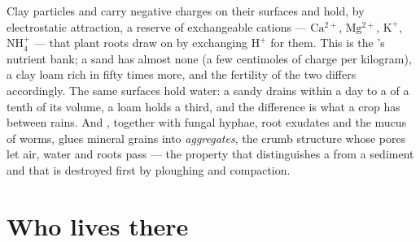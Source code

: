 \begin{proposition}\label{prop:b2:living-soil:cec}
Clay particles and  carry negative charges on their surfaces
and hold, by electrostatic attraction, a reserve of exchangeable
cations --- $\mathrm{Ca^{2+}}$, $\mathrm{Mg^{2+}}$, $\mathrm{K^{+}}$, $\mathrm{NH_4^{+}}$ --- that
plant roots draw on by exchanging $\mathrm{H^{+}}$ for them. This
\emph{} is the 's nutrient bank; a sand
has almost none (a few centimoles of charge per kilogram), a clay
loam rich in  fifty times more, and the fertility of the two
differs accordingly. The same surfaces hold water: a sandy 
drains within a day to a \emph{} of a tenth of its
volume, a loam holds a third, and the difference is what a crop
has between rains. And , together with fungal hyphae, root
exudates and the mucus of worms, glues mineral grains into
\emph{aggregates}, the crumb structure whose pores let air, water
and roots pass --- the property that distinguishes a  from a
sediment and that is destroyed first by ploughing and compaction.
\end{proposition}

\section{Who lives there}

